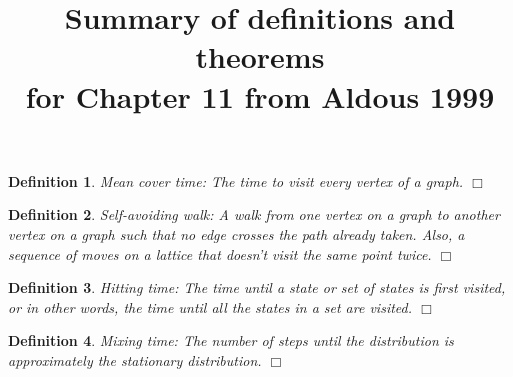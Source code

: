 \documentclass[11pt, letterpaper]{article}
\newenvironment{definition}
{\noindent\begin{defn}}
{\hfill $\Box$ \end{defn}}
\newtheorem{defn}{Definition}
\begin{document}
\title{Summary of definitions and theorems\\for Chapter 11 from Aldous 1999}
\maketitle

\begin{definition}
\textit{Mean cover time}: The time to visit every vertex of a graph.
\end{definition}

\begin{definition}
\textit{Self-avoiding walk}: A walk from one vertex on a graph to another vertex on a graph such that no edge crosses the path already taken.  Also, a sequence of moves on a lattice that doesn't visit the same point twice.
\end{definition}


\begin{definition}
\textit{Hitting time}:  The time until a state or set of states is first visited, or in other words, the time until all the states in a set are visited.
\end{definition}

\begin{definition}
\textit{Mixing time}: The number of steps until the distribution is approximately the stationary distribution.
\end{definition}
\end{document}
